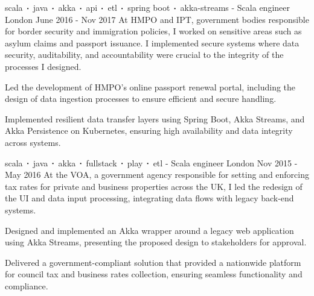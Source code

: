 \begin{cventries}
    \cventry
    {scala$\sqbig$java$\sqbig$akka$\sqbig$api$\sqbig$etl$\sqbig$spring boot$\sqbig$akka-streams}
    { - Scala engineer}
    {London}
    {June 2016 - Nov 2017}
    {At HMPO and IPT, government bodies responsible for border security and immigration policies, I worked on sensitive areas such as asylum claims and passport issuance. I implemented secure systems where data security, auditability, and accountability were crucial to the integrity of the processes I designed.}
    {
        \begin{cvitems}
            \item{Led the development of HMPO’s online passport renewal portal, including the design of data ingestion processes to ensure efficient and secure handling.}
            \item{Implemented resilient data transfer layers using Spring Boot, Akka Streams, and Akka Persistence on Kubernetes, ensuring high availability and data integrity across systems.}
        \end{cvitems}
    }

    \cventry
    {scala$\sqbig$java$\sqbig$akka$\sqbig$fullstack$\sqbig$play$\sqbig$etl}
    { - Scala engineer}
    {London}
    {Nov 2015 - May 2016}
    {At the VOA, a government agency responsible for setting and enforcing tax rates for private and business properties across the UK, I led the redesign of the UI and data input processing, integrating data flows with legacy back-end systems.}
    {
        \begin{cvitems}
            \item{Designed and implemented an Akka wrapper around a legacy web application using Akka Streams, presenting the proposed design to stakeholders for approval.}
            \item{Delivered a government-compliant solution that provided a nationwide platform for council tax and business rates collection, ensuring seamless functionality and compliance.}
        \end{cvitems}
    }


\end{cventries}
